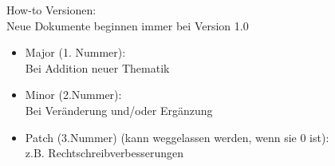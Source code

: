 \documentclass[
	headings=optiontotocandhead,%
	oneside,
	numbers=noenddot,%
	toc=flat, %
	10pt, %
	parskip=full, %
	listof=totoc, %
	listof=flat, %
	numbers=noenddot, %
	bibliography=totoc, %
	a4paper,DIV=14,
]{scrartcl}
\begin{document}
How-to Versionen:\\
Neue Dokumente beginnen immer bei Version 1.0\\
\begin{itemize}
\item{Major (1. Nummer):}\\
Bei Addition neuer Thematik

\item{Minor (2.Nummer):}\\
Bei Veränderung und/oder Ergänzung

\item{Patch (3.Nummer) (kann weggelassen werden, wenn sie 0 ist):}\\
z.B. Rechtschreibverbesserungen
\end{itemize}
\end{document}
